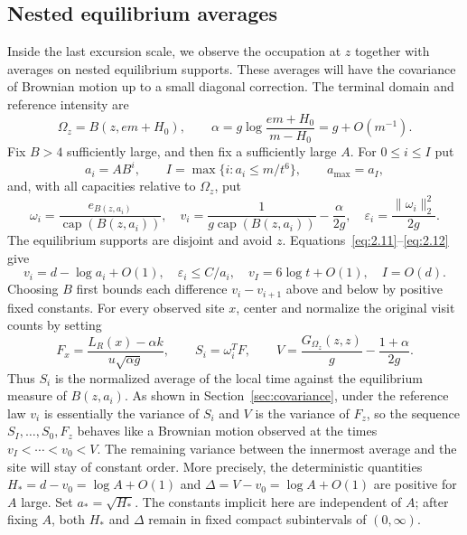 \documentclass[11pt,letterpaper,reqno]{amsart}
\newif\ifrevmarks \revmarkstrue
\newcommand{\add}[1]{\ifrevmarks\textcolor{revorange}{#1}\else#1\fi}
\numberwithin{equation}{section}
\theoremstyle{remark}
\begin{document}
\subsection{\texorpdfstring{\add{Nested equilibrium averages}}{Nested equilibrium averages}}\label{sec:averageconstraints}
Inside the last excursion scale, we observe the occupation at $z$ together with averages on nested equilibrium supports. These averages will have the covariance of Brownian motion up to a small diagonal correction. The terminal domain and reference intensity are
\begin{equation}\label{eq:5.6}
\Omega_z=B(z,em+H_0),\qquad
\alpha=g\log\frac{em+H_0}{m-H_0}=g+O(m^{-1}).
\end{equation}
Fix $B>4$ sufficiently large, and then fix a sufficiently large $A$.
For $0\le i\le I$ put
\begin{equation}\label{eq:5.7}
a_i=AB^i,\qquad I=\max\{i:a_i\le m/t^6\},\qquad a_{\max}=a_I,
\end{equation}
and, with all capacities relative to $\Omega_z$, put
\begin{equation}\label{eq:5.8}
\omega_i=\frac{e_{B(z,a_i)}}{\operatorname{cap}(B(z,a_i))},\quad
v_i=\frac1{g\operatorname{cap}(B(z,a_i))}-\frac\alpha{2g},\quad
\varepsilon_i=\frac{\|\omega_i\|_2^2}{2g}.
\end{equation}
The equilibrium supports are disjoint and avoid $z$. Equations~\eqref{eq:2.11}--\eqref{eq:2.12} give
\begin{equation}\label{eq:5.9}
v_i=d-\log a_i+O(1),\quad \varepsilon_i\le C/a_i,\quad
v_I=6\log t+O(1),\quad I=O(d).
\end{equation}
Choosing $B$ first bounds each difference $v_i-v_{i+1}$ above and below by positive fixed constants.
For every observed site $x$, center and normalize the original visit counts by setting
\[
F_x=\frac{L_R(x)-\alpha k}{u\sqrt{\alpha g}},\qquad
S_i=\omega_i^TF,\qquad
V=\frac{G_{\Omega_z}(z,z)}g-\frac{1+\alpha}{2g}.
\]
\add{Thus $S_i$ is the normalized average of the local time against the equilibrium measure of $B(z,a_i)$. As shown in Section~\ref{sec:covariance}, under the reference law $v_i$ is essentially the variance of $S_i$ and $V$ is the variance of $F_z$, so the sequence $S_I,\ldots,S_0,F_z$ behaves like a Brownian motion observed at the times $v_I<\cdots<v_0<V$.} The remaining variance between the innermost average and the site will stay of constant order. More precisely, the deterministic quantities $H_*=d-v_0=\log A+O(1)$ and
$\Delta=V-v_0=\log A+O(1)$ are positive for $A$ large. Set $a_*=\sqrt{H_*}$.
The constants implicit here are independent of $A$; after fixing $A$, both $H_*$ and $\Delta$ remain in fixed compact subintervals of $(0,\infty)$.
\end{document}
